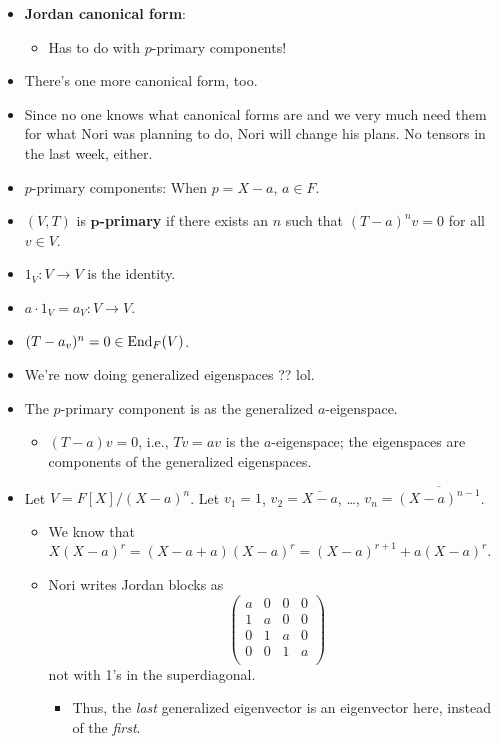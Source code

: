 \documentclass[../notes.tex]{subfiles}
\begin{document}
\begin{itemize}
    \item \textbf{Jordan canonical form}:
    \begin{itemize}
        \item Has to do with $p$-primary components!
    \end{itemize}
    \item There's one more canonical form, too.
    \item Since no one knows what canonical forms are and we very much need them for what Nori was planning to do, Nori will change his plans. No tensors in the last week, either.
    \item $p$-primary components: When $p=X-a$, $a\in F$.
    \item $(V,T)$ is \textbf{$\bm{p}$-primary} if there exists an $n$ such that $(T-a)^nv=0$ for all $v\in V$.
    \item $1_V:V\to V$ is the identity.
    \item $a\cdot 1_V=a_V:V\to V$.
    \item $(T-a_v)^n=0\in\operatorname{End}_F(V)$.
    \item We're now doing generalized eigenspaces ?? lol.
    \item The $p$-primary component is as the generalized $a$-eigenspace.
    \begin{itemize}
        \item $(T-a)v=0$, i.e., $Tv=av$ is the $a$-eigenspace; the eigenspaces are components of the generalized eigenspaces.
    \end{itemize}
    \item Let $V=F[X]/(X-a)^n$. Let $v_1=1$, $v_2=\overline{X-a}$, \dots, $v_n=\overline{(X-a)^{n-1}}$.
    \begin{itemize}
        \item We know that $X(X-a)^r=(X-a+a)(X-a)^r=(X-a)^{r+1}+a(X-a)^r$.
        \item Nori writes Jordan blocks as
        \begin{equation*}
            \begin{pmatrix}
                a & 0 & 0 & 0\\
                1 & a & 0 & 0\\
                0 & 1 & a & 0\\
                0 & 0 & 1 & a\\
            \end{pmatrix}
        \end{equation*}
        not with 1's in the superdiagonal.
        \begin{itemize}
            \item Thus, the \emph{last} generalized eigenvector is an eigenvector here, instead of the \emph{first}.
        \end{itemize}
    \end{itemize}
\end{itemize}
\end{document}
